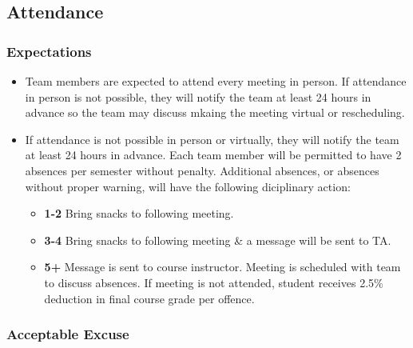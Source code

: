 \documentclass{article}
\begin{document}
\subsection*{Attendance}

\subsubsection*{Expectations}
\begin{itemize}
\item Team members are expected to attend every meeting in person. If attendance in person is not possible, they will notify the team at least 24 hours 
in advance so the team may discuss mkaing the meeting virtual or rescheduling.
\item If attendance is not possible in person or virtually, they will notify the team at least 24 hours in advance. Each team member will be permitted to have 2 absences per semester 
without penalty. Additional absences, or absences without proper warning, will have the following diciplinary action:

\begin{itemize}
  \item[] \textbf{1-2} Bring snacks to following meeting.
  \item[] \textbf{3-4} Bring snacks to following meeting \& a message will be sent to TA.
  \item[] \textbf{5+} Message is sent to course instructor. Meeting is scheduled with team to discuss absences. If meeting is not attended, student receives 2.5\% deduction in final course grade per offence.
\end{itemize}
\end{itemize}

\subsubsection*{Acceptable Excuse}
\end{document}

